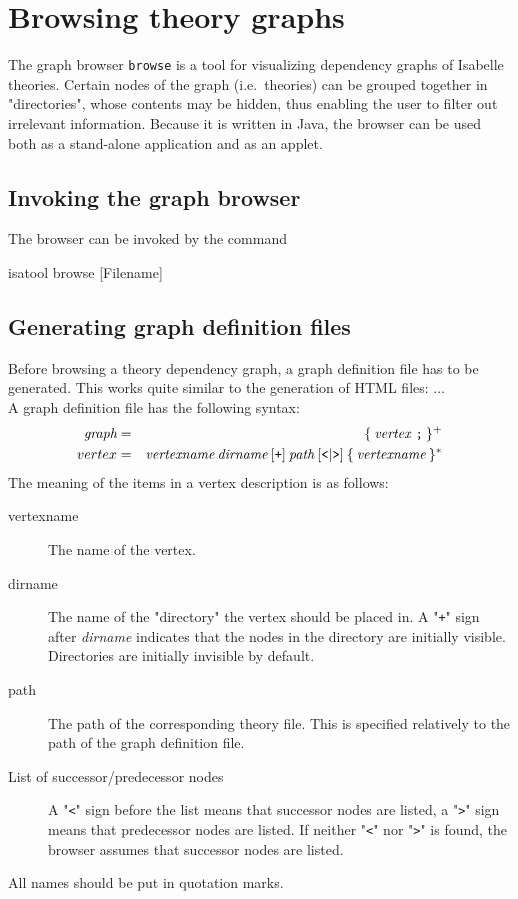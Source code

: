 \chapter{Browsing theory graphs} \label{browse}

The graph browser {\tt browse} is a tool for visualizing
dependency graphs of Isabelle theories. Certain nodes of
the graph (i.e.~theories) can be grouped together in "directories",
whose contents may be hidden, thus enabling the user to filter out
irrelevant information. Because it is written in Java, the browser
can be used both as a stand-alone application and as an applet.

\section{Invoking the graph browser}
The browser can be invoked by the command
\begin{ttbox}
isatool browse [Filename]
\end{ttbox}

\section{Generating graph definition files}
Before browsing a theory dependency graph, a graph definition file
has to be generated. This works quite similar to the generation
of HTML files: $\ldots$ \\
A graph definition file has the following syntax:
\begin{eqnarray*}
\mbox{\it graph} & = & \{ \: \mbox{\it vertex \tt ;} \: \} ^ + \\
vertex & = & \mbox{\it vertexname} \: \mbox{\it dirname} \: [ \mbox{\tt +} ]
\: \mbox{\it path} \: [ \mbox{\tt <} | \mbox{\tt >} ] \: \{ \: \mbox{\it vertexname} \: \} ^ *
\end{eqnarray*}
The meaning of the items in a vertex description is as follows:
\begin{description}
\item[vertexname] The name of the vertex.
\item[dirname] The name of the "directory" the vertex should be placed in.
A "{\tt +}" sign after {\it dirname} indicates that the nodes in the directory
are initially visible. Directories are initially invisible by default.
\item[path] The path of the corresponding theory file. This is specified
relatively to the path of the graph definition file.
\item[List of successor/predecessor nodes] A "{\tt <}" sign before the list
means that successor nodes are listed, a "{\tt >}" sign means that predecessor
nodes are listed. If neither "{\tt <}" nor "{\tt >}" is found, the browser
assumes that successor nodes are listed.
\end{description}
All names should be put in quotation marks.

